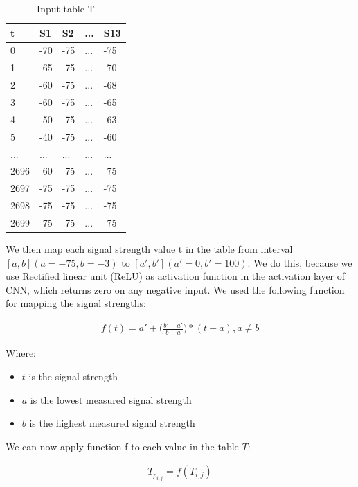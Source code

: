 \begin{table}[H]
    \centering
    \begin{tabular}{|l|l|l|l|l|}
    \hline
    t    & S1  & S2  & ... & S13 \\ \hline
    0    & -70 & -75 & ... & -75 \\ \hline
    1    & -65 & -75 & ... & -70 \\ \hline
    2    & -60 & -75 & ... & -68 \\ \hline
    3    & -60 & -75 & ... & -65 \\ \hline
    4    & -50 & -75 & ... & -63 \\ \hline
    5    & -40 & -75 & ... & -60 \\ \hline
    ...  & ... & ... & ... & ... \\ \hline
    2696 & -60 & -75 & ... & -75 \\ \hline
    2697 & -75 & -75 & ... & -75 \\ \hline
    2698 & -75 & -75 & ... & -75 \\ \hline
    2699 & -75 & -75 & ... & -75 \\ \hline
    \end{tabular}
    \caption{Input table T}
\end{table}

\par
We then map each signal strength value t in the table from interval $[a, b] (a = -75, b = -3)$ to $[a', b'] (a' = 0, b' = 100)$. We do this, because we use Rectified linear unit (ReLU) as activation function in the activation layer of CNN, which returns zero on any negative input. We used the following function for mapping the signal strengths:

\begin{align*}
     f(t) =  a' +  \big( \frac{b' - a'}{b - a} \big) * (t-a), a \neq b  
\end{align*}

\par
Where:
\begin{itemize}
    \item $t$ is the signal strength
	\item $a$ is the lowest measured signal strength
	\item $b$ is the highest measured signal strength
\end{itemize}

\par
We can now apply function f to each value in the table $T$:

\begin{align*}
     T_{p_{i,j}} = f(T_{i,j})  
\end{align*}

